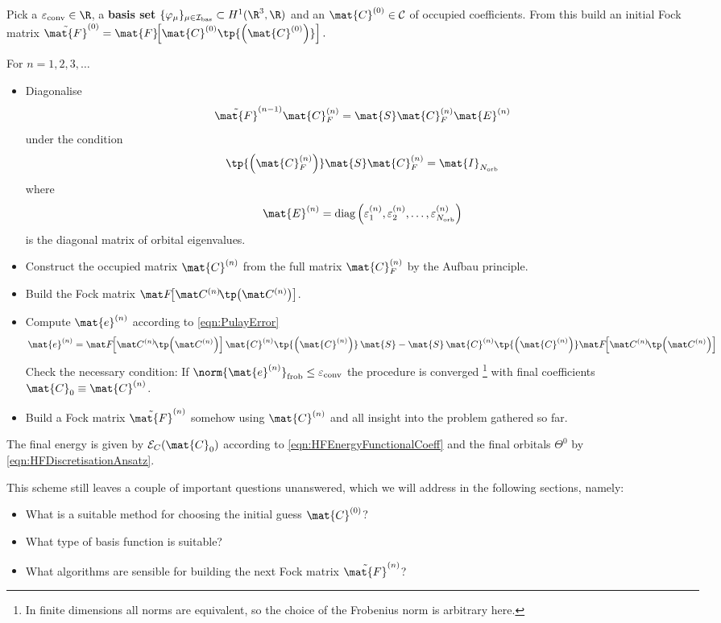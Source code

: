 \begin{rem}
	\label{rem:SCFcoeff}
	Pick a  $\epsilonconv \in \R$,
	a \textbf{basis set} $\{\varphi_\mu\}_{\mu\in\Ibas} \subset H^1(\R^3, \R)$
	and an  $\mat{C}^{(0)} \in \mathcal{C}$
	of occupied coefficients.
	From this build an initial Fock matrix
	$\tilde{\mat{F}}^{(0)} = \mat{F}\!\!\left[\mat{C}^{(0)} \tp{\left(\mat{C}^{(0)}\right)}\right].$

	\noindent
	For $n=1,2,3,\ldots$
	\begin{itemize}
		\item Diagonalise
			\[ \tilde{\mat{F}}^{(n-1)} \mat{C}_F^{(n)} = \mat{S} \mat{C}_F^{(n)} \mat{E}^{(n)} \]
			under the condition
			\[ \tp{\left(\mat{C}_F^{(n)}\right)} \mat{S}  \mat{C}_F^{(n)} = \mat{I}_{\Norb} \]
			where
			\[
				\mat{E}^{(n)}
				= \text{diag}\left(\varepsilon_1^{(n)},
				\varepsilon_2^{(n)}, \ldots,
				\varepsilon_{\Norb}^{(n)}\right)
			\]
			is the diagonal matrix of orbital eigenvalues.
		\item Construct the occupied matrix $\mat{C}^{(n)}$
			from the full matrix $\mat{C}_F^{(n)}$ by the Aufbau principle.
		\item Build the Fock matrix $\matFnfull$.
		\item Compute $\mat{e}^{(n)}$ according to \eqref{eqn:PulayError}
			\[
			\mat{e}^{(n)}
			= \matFnfull \mat{C}^{(n)} \tp{\left(\mat{C}^{(n)}\right)} \, \mat{S}
			- \mat{S} \, \mat{C}^{(n)} \tp{\left(\mat{C}^{(n)}\right)} \matFnfull
			\]
			Check the necessary condition:
			If $\norm{ \mat{e}^{(n)} }_\text{frob} \leq  \epsilonconv$
			the procedure is converged%
			\footnote{In finite dimensions all norms are equivalent,
				so the choice of the Frobenius norm is arbitrary here.}
			with final coefficients $\mat{C}_0 \equiv \mat{C}^{(n)}$.
		\item Build a Fock matrix $\tilde{\mat{F}}^{(n)}$ somehow
			using $\mat{C}^{(n)}$ and all insight into the problem gathered so far.
	\end{itemize}
	The final \HF energy is given by $\mathcal{E}_C(\mat{C}_0)$
	according to \eqref{eqn:HFEnergyFunctionalCoeff} and the final
	\SCF orbitals $\Theta^0$ by \eqref{eqn:HFDiscretisationAnsatz}.
\end{rem}
This scheme still leaves a couple of important questions unanswered,
which we will address in the following sections, namely:
\begin{itemize}
	\item What is a suitable method for choosing the initial guess $\mat{C}^{(0)}$?
	\item What type of basis function is suitable?
	\item What algorithms are sensible for building the next
		Fock matrix $\tilde{\mat{F}}^{(n)}$?
\end{itemize}
